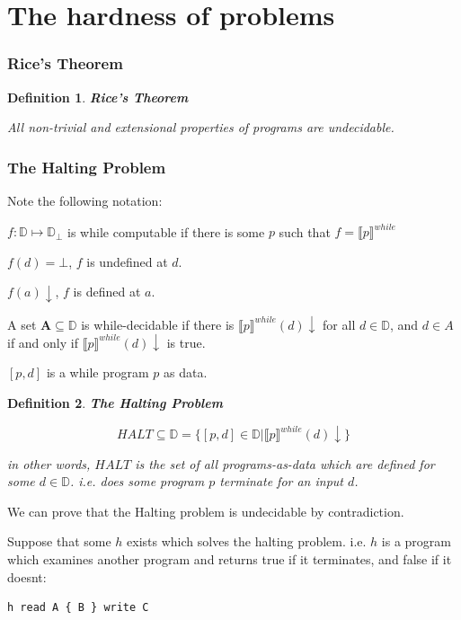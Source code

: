 \documentclass[a4paper, final]{article}
\newtheorem{definition}{Definition}
\begin{document}
\part{The hardness of problems}
\section{Rice's Theorem}
\begin{definition}
	\textbf{Rice's Theorem}

	All non-trivial and extensional properties of programs are undecidable.
\end{definition}

\section{The Halting Problem}

Note the following notation:

$f:\mathbb{D}\mapsto\mathbb{D}_\bot$ is while computable if there is
some $p$ such that $f=\llbracket p \rrbracket^{while}$

$f(d)=\bot$, $f$ is undefined at $d$.

$f(a)\downarrow$, $f$ is defined at $a$.

A set $\textbf{A}\subseteq \mathbb{D}$ is while-decidable if there is
$\llbracket p \rrbracket^{while}(d)\downarrow$ for all $d\in\mathbb{D}$, and $d\in A$ if and only if
$\llbracket p \rrbracket^{while}(d)\downarrow$ is true.

$[p,d]$ is a while program $p$ as data.
\begin{definition}
	\textbf{The Halting Problem}

	$$HALT\subseteq\mathbb{D} = \{[p,d]\in\mathbb{D}|\llbracket p \rrbracket^{while}(d)\downarrow\}$$

	in other words, $HALT$ is the set of all programs-as-data which are defined
	for some $d\in\mathbb{D}$. i.e. does some program $p$ terminate for an input $d$.
\end{definition}

We can prove that the Halting problem is undecidable by contradiction.

Suppose that some $h$ exists which solves the halting problem. i.e. $h$ is a program
which examines another program and returns true if it terminates, and false if it doesnt:

\begin{lstlisting}
h read A { B } write C
\end{lstlisting}
\end{document}
